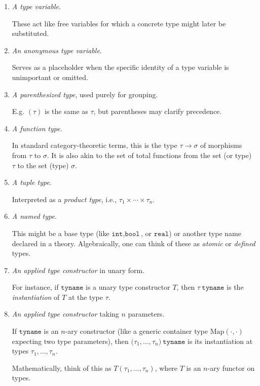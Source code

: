 \begin{enumerate}
	\item \textit{A type variable}.
	
	These act like free variables for which a concrete type might later be substituted.
	\item \textit{An anonymous type variable}.  
	
	Serves as a placeholder when the specific identity of a type variable is unimportant or omitted.
	\item \textit{A parenthesized type}, used purely for grouping.  
	
	E.g. \((\tau)\) is the same as \(\tau\), but parentheses may clarify precedence.
	
	\item \textit{A function type}.
	  
	In standard category-theoretic terms, this is the type \(\tau \to \sigma\) of morphisms from \(\tau\) to \(\sigma\). It is also akin to the set of total functions from the set (or type) \(\tau\) to the set (type) \(\sigma\).
	
	\item \textit{A tuple type}.
	  
	Interpreted as a \textit{product type}, i.e., \(\tau_1 \times \cdots \times \tau_n\).  
	
	\item \textit{A named type}.  
	
	This might be a base type (like \(\texttt{int}, \texttt{bool}\), or \(\texttt{real}\)) or another type name declared in a theory. Algebraically, one can think of these as \textit{atomic} or \textit{defined} types.
	
	\item \textit{An applied type constructor} in unary form.  
	
	For instance, if \(\mathtt{tyname}\) is a unary type constructor \(T\), then \(\tau\ \mathtt{tyname}\) is the \textit{instantiation} of \(T\) at the type \(\tau\).  
	
	
	\item \textit{An applied type constructor} taking \(n\) parameters.  
	
	If \(\mathtt{tyname}\) is an \(n\)-ary constructor (like a generic container type \(\mathrm{Map}(\cdot,\cdot)\) expecting two type parameters), then \(\bigl(\tau_1,\ldots,\tau_n\bigl)\ \mathtt{tyname}\) is its instantiation at types \(\tau_1,\ldots,\tau_n\).
	
	Mathematically, think of this as \(T(\tau_1,\dots,\tau_n)\), where \(T\) is an \(n\)-ary functor on types.
\end{enumerate}


